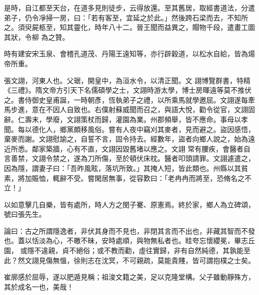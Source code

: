 \begin{pinyinscope}
是時，自江都至天台，在道多見則徒步，云得放還。至其舊居，取經書道法，分遣弟子，仍令凈掃一房，曰：「若有客至，宜延之於此。」然後跨石梁而去，不知所之。須臾屍柩至，知其靈化，時年八十二。晉王聞而益異之，賵物千段，遣畫工圖其狀，令柳
 為之贊。



 時有建安宋玉泉、會稽孔道茂、丹陽王遠知等，亦行辟穀道，以松水自給，皆為煬帝所重。



 張文詡，河東人也。父琚，開皇中，為洹水令，以清正聞。文
 詡博覽群書，特精《三禮》。隋文帝方引天下名儒碩學之士，文詡時游太學，博士房暉遠等莫不推伏之。書侍御史皇甫誕，一時朝彥，恆執弟子之禮，以所乘馬就學邀屈。文詡遂每牽馬步進，意在不因人自致也。右僕射蘇威聞而召之，與語大悅，勸令從官，文詡固辭。仁壽末，學廢，文詡策杖而歸，灌園為業。州郡頻舉，皆不應命。事母以孝聞。每以德化人，鄉黨頗移風俗。嘗有人夜中竊刈其麥者，見而避之。盜因感悟，棄麥而謝。文詡慰諭之，自誓不言，固令持去。經數年，盜者向鄉人說之，始為遠近所悉。鄰家築牆，心有不直，文詡因毀舊堵以應之。文詡
 常有腰疾，會醫者自言善禁，文詡令禁之，遂為刀所傷，至於頓伏床枕。醫者叩頭請罪。文詡遽遣之，因為隱，謂妻子曰：「吾昨風眩，落坑所致。」其掩人短，皆此類也。州縣以其貧素，將加賑恤，輒辭不受。嘗閑居無事，從容歎曰：「老冉冉而將至，恐脩名之不立！」



 以如意擊几自樂，皆有處所，時人方之閔子騫、原憲焉。終於家，鄉人為立碑頌，號曰張先生。



 論曰：古之所謂隱逸者，非伏其身而不見也，非閉其言而不出也，非藏其智而不發也。蓋以恬淡為心，不皦不昧，安時處順，與物無私者也。眭夸忘懷纓冕，畢志丘園，
 或隱不違親，貞不絕俗；或不教而勸，虛往實歸，非有自然純德，其孰能至此？然文詡見傷無慍，徐則志在沈冥，不可親疏，莫能貴賤，皆可謂抱樸之士矣。



 崔廓感於屈辱，遂以肥遁見稱；祖浚文籍之美，足以克隆堂構。父子雖動靜殊方，其於成名一也，美哉！



\end{pinyinscope}